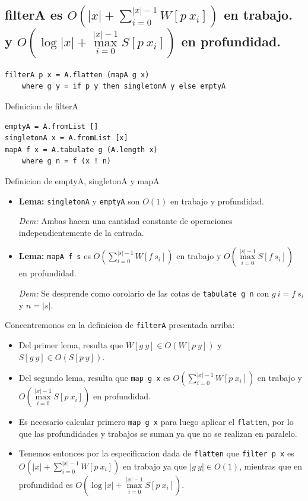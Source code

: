 \documentclass[12pt]{article}
\begin{document}
\subsection{filterA es $O(|x| + \sum\limits_{i=0}^{|x|-1} W[p\ x_i])$ en trabajo.\\ y $O(\log |x| + \max\limits_{i=0}^{|x|-1} S[p\ x_i])$ en profundidad.}
\begin{table}[h]
\begin{lstlisting}
filterA p x = A.flatten (mapA g x)
    where g y = if p y then singletonA y else emptyA
\end{lstlisting}
\caption{Definicion de filterA}
\end{table}
\begin{table}[h]
\begin{lstlisting}
emptyA = A.fromList []
singletonA x = A.fromList [x]
mapA f x = A.tabulate g (A.length x)
    where g n = f (x ! n)
\end{lstlisting}
\caption{Definicion de emptyA, singletonA y mapA}
\end{table}
\begin{itemize}
\item \textbf{Lema:} \texttt{singletonA} y \texttt{emptyA} son $O(1)$ en trabajo y profundidad.

 \textit{Dem:} Ambas hacen una cantidad constante de operaciones independientemente de la entrada.
 
\item \textbf{Lema:} \texttt{mapA f s} es $O( \sum\limits_{i=0}^{|s|-1} W[f\ s_i] )$ en trabajo y $O( \max\limits_{i=0}^{|s|-1} S[f\ s_i] )$ en profundidad.

 \textit{Dem:} Se desprende como corolario de las cotas de \texttt{tabulate g n} con $g\ i = f\ s_i$ y $n=|s|$. 
 
\end{itemize}

Concentremonos en la definicion de \texttt{filterA} presentada arriba:
\begin{itemize}
\item Del primer lema, resulta que $W[g\ y]\in O(W[p\ y])$ y $S[g\ y]\in O(S[p\ y])$.
\item Del segundo lema, resulta que \texttt{map\ g\ x} es $O(\sum\limits_{i=0}^{|x|-1} W[p\ x_i])$ en trabajo y $O(\max\limits_{i=0}^{|x|-1} S[p\ x_i])$ en profundidad.
\item Es necesario calcular primero \texttt{map\ g\ x} para luego aplicar el \texttt{flatten}, por lo que las profundidades y trabajos se suman ya que no se realizan en paralelo.
\item Tenemos entonces por la especificacion dada de \texttt{flatten} que \texttt{filter\ p\ x} es $O(|x| + \sum\limits_{i=0}^{|x|-1} W[p\ x_i])$ en trabajo ya que $|g\ y| \in O(1)$, mientras que en profundidad es $O(\log |x| + \max\limits_{i=0}^{|x|-1} S[p\ x_i])$.
\end{itemize}
\end{document}

